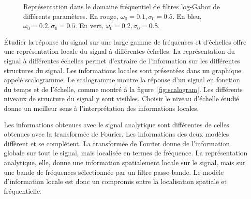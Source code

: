 \begin{figure}
    \centering

    \caption[Filtres log-Gabor]{Représentation dans le domaine fréquentiel de filtres log-Gabor de différents paramètres. En rouge, $\omega_0=0.1, \sigma_0 = 0.5$. En bleu, $\omega_0=0.2, \sigma_0 = 0.5$. En vert, $\omega_0=0.2, \sigma_0 = 0.8$.}
    \label{fig:log-gabor-filters}
\end{figure}

\noindent Étudier la réponse du signal sur une large gamme de fréquences et d'échelles offre une représentation locale du signal à différentes échelles. La représentation du signal à différentes échelles permet d'extraire de l'information sur les différentes structures du signal. Les informations locales sont présentées dans un graphique appelé scalogramme. Le scalogramme montre la réponse d'un signal en fonction du temps et de l'échelle, comme montré à la figure~\ref{fig:scalogram}. Les différents niveaux de structure du signal y sont visibles. Choisir le niveau d'échelle étudié donne un meilleur sens à l'interprétation des informations locales.

\bigskip

Les informations obtenues avec le signal analytique sont différentes de celles obtenues avec la transformée de Fourier. Les informations des deux modèles diffèrent et se complètent. La transformée de Fourier donne de l'information globale sur tout le signal, mais localisée en termes de fréquence. La représentation analytique, elle, donne une information spatialement locale sur le signal, mais sur une bande de fréquences sélectionnée par un filtre passe-bande. Le modèle d'information locale est donc un compromis entre la localisation spatiale et fréquentielle.


